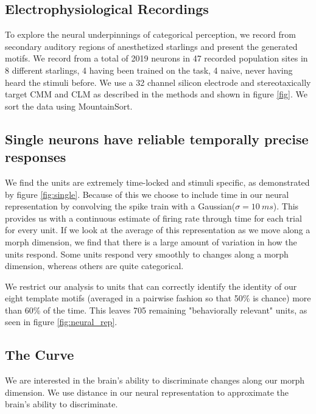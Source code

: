 \subsection{Electrophysiological Recordings}

To explore the neural underpinnings of categorical perception, we record from secondary auditory regions of anesthetized starlings and present the generated motifs. We record from a total of 2019 neurons in 47 recorded population sites in 8 different starlings, 4 having been trained on the task, 4 naive, never having heard the stimuli before. We use a 32 channel silicon electrode and stereotaxically target \ac{CMM} and \ac{CLM} as described in the methods and shown in figure \ref{fig}. We sort the data using MountainSort\cite{mountainsort}. 

\subsection{Single neurons have reliable temporally precise responses}



We find the units are extremely time-locked and stimuli specific, as demonstrated by figure \ref{fig:single}. Because of this we choose to include time in our neural representation by convolving the spike train with a Gaussian($\sigma = \SI{10}{ms}$). This provides us with a continuous estimate of firing rate through time for each trial for every unit. If we look at the average of this representation as we move along a morph dimension, we find that there is a large amount of variation in how the units respond. Some units respond very smoothly to changes along a morph dimension, whereas others are quite categorical.



We restrict our analysis to units that can correctly identify the identity of our eight template motifs (averaged in a pairwise fashion so that 50\% is chance) more than 60\% of the time. This leaves 705 remaining "behaviorally relevant" units, as seen in figure \ref{fig:neural_rep}.

\subsection{The \Thielk Curve}



We are interested in the brain's ability to discriminate changes along our morph dimension. We use distance in our neural representation to approximate the brain's ability to discriminate. 

